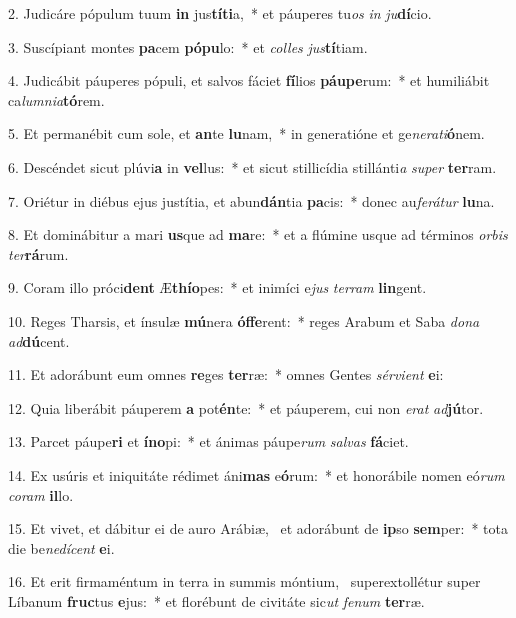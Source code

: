 2. Judicáre pópulum tuum \textbf{in} jus\textbf{tí}\textbf{ti}a,~*  et páuperes tu\textit{os} \textit{in} \textit{ju}\textbf{dí}cio.\

3. Suscípiant montes \textbf{pa}cem \textbf{pó}\textbf{pu}lo:~*  et \textit{col}\textit{les} \textit{jus}\textbf{tí}tiam.\

4. Judicábit páuperes pópuli, et salvos fáciet \textbf{fí}lios \textbf{páu}\textbf{pe}rum:~*  et humiliábit ca\textit{lum}\textit{ni}\textit{a}\textbf{tó}rem.\

5. Et permanébit cum sole, et \textbf{an}te \textbf{lu}nam,~*  in generatióne et ge\textit{ne}\textit{ra}\textit{ti}\textbf{ó}nem.\

6. Descéndet sicut plúvi\textbf{a} in \textbf{vel}lus:~*  et sicut stillicídia stillánti\textit{a} \textit{su}\textit{per} \textbf{ter}ram.\

7. Oriétur in diébus ejus justítia, et abun\textbf{dán}tia \textbf{pa}cis:~*  donec au\textit{fe}\textit{rá}\textit{tur} \textbf{lu}na.\

8. Et dominábitur a mari \textbf{us}que ad \textbf{ma}re:~*  et a flúmine usque ad términos \textit{or}\textit{bis} \textit{ter}\textbf{rá}rum.\

9. Coram illo próci\textbf{dent} Æ\textbf{thí}\textbf{o}pes:~*  et inimíci e\textit{jus} \textit{ter}\textit{ram} \textbf{lin}gent.\

10. Reges Tharsis, et ínsulæ \textbf{mú}nera \textbf{óf}\textbf{fe}rent:~*  reges Arabum et Saba \textit{do}\textit{na} \textit{ad}\textbf{dú}cent.\

11. Et adorábunt eum omnes \textbf{re}ges \textbf{ter}ræ:~*  omnes Gentes \textit{sér}\textit{vi}\textit{ent} \textbf{e}i:\

12. Quia liberábit páuperem \textbf{a} pot\textbf{én}te:~*  et páuperem, cui non \textit{e}\textit{rat} \textit{ad}\textbf{jú}tor.\

13. Parcet páupe\textbf{ri} et \textbf{ín}\textbf{o}pi:~*  et ánimas páupe\textit{rum} \textit{sal}\textit{vas} \textbf{fá}ciet.\

14. Ex usúris et iniquitáte rédimet áni\textbf{mas} e\textbf{ó}rum:~*  et honorábile nomen eó\textit{rum} \textit{co}\textit{ram} \textbf{il}lo.\

15. Et vivet, et dábitur ei de auro Arábiæ, \dag\  et adorábunt de \textbf{ip}so \textbf{sem}per:~*  tota die be\textit{ne}\textit{dí}\textit{cent} \textbf{e}i.\

16. Et erit firmaméntum in terra in summis móntium, \dag\  superextollétur super Líbanum \textbf{fruc}tus \textbf{e}jus:~*  et florébunt de civitáte sic\textit{ut} \textit{fe}\textit{num} \textbf{ter}ræ.\

